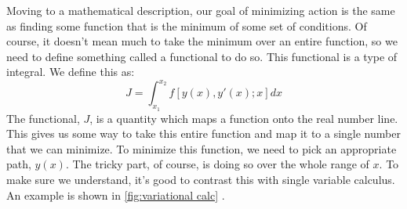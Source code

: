 \documentclass[10pt, openany, titlepage]{book}
\theoremstyle{definition}
\newcounter{example}[chapter]
\let\oldautoref\autoref
\renewcommand{\autoref}[1]{%
  \begingroup
  \hypersetup{linkcolor=black}%
  \oldautoref{#1}%
  \endgroup
}
\begin{document}
Moving to a mathematical description, our goal of minimizing \gls{action} is the same as finding some function that is the minimum of some set of conditions. Of course, it doesn't mean much to take the minimum over an entire function, so we need to define something called a \gls{functional} to do so. This \gls{functional} is a type of integral. We define this as:
\begin{equation}\label{eq:functional}
    J=\int_{x_1}^{x_2}f\left[y(x),y'(x);x\right]{dx}
\end{equation}
The \gls{functional}, $J$, is a quantity which maps a function onto the real number line. This gives us some way to take this entire function and map it to a single number that we can minimize. To minimize this function, we need to pick an appropriate path, $y(x)$.  The tricky part, of course, is doing so over the whole range of $x$. To make sure we understand, it's good to contrast this with single variable calculus. An example is shown in \autoref{fig:variational calc}.
\end{document}
